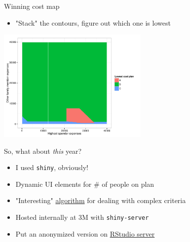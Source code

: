 \documentclass[sans,aspectratio=169,presentation,bigger,fleqn]{beamer}
\begin{document}
\begin{frame}[label=sec-15]{Winning cost map}
\begin{itemize}
\item "Stack" the contours, figure out which one is lowest
\end{itemize}

\begin{center}
\includegraphics[height=5.5cm]{./img/ins-cost-map.pdf}
\end{center}
\end{frame}
\begin{frame}[fragile,label=sec-16]{So, what about \emph{this} year?}
 \begin{itemize}
\item I used \texttt{shiny}, obviously!
\item Dynamic UI elements for \# of people on plan
\item "Interesting" \href{http://stackoverflow.com/questions/18116967/dealing-with-conditionals-in-a-better-manner-than-deeply-nested-ifelse-blocks}{algorithm} for dealing with complex criteria
\item Hosted internally at 3M  with \texttt{shiny-server}
\item Put an anonymized version on \href{http://spark.rstudio.com/jwhendy/insurance-visualizer}{RStudio server}
\end{itemize}
\end{frame}
\end{document}
